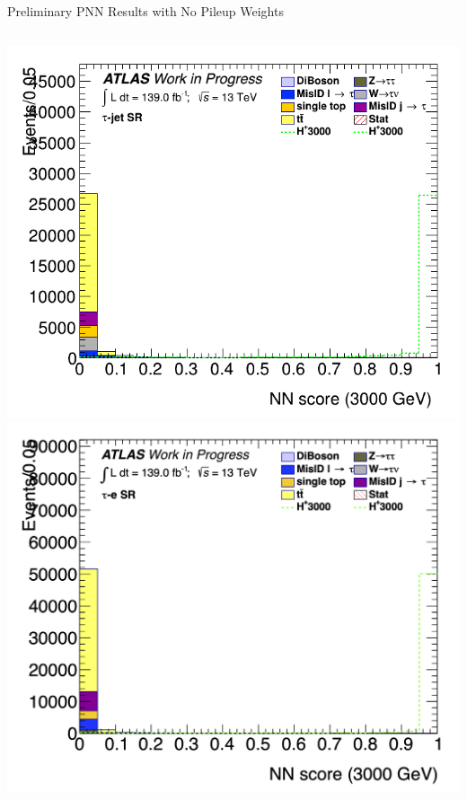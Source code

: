 \documentclass[aspectratio=169,xcolor=table]{beamer}
\begin{document}
\begin{frame}{Preliminary PNN Results with No Pileup Weights}
\begin{columns}
        \includegraphics[height=.24\textheight,keepaspectratio=true]{Scores/taujet/rnnTest_1p_3p_noweight/clf_score_GB200_mass_3000to3000_SR_TAUJET.png}
        \includegraphics[height=.24\textheight,keepaspectratio=true]{Scores/taulep/myOutDirClfEval_1p_noUpsilon_test_full/clf_score_GB200_mass_3000to3000_SR_TAUEL.png}

\end{columns}
\end{frame}
\end{document}

